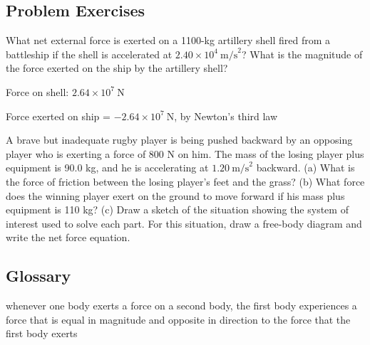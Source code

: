 \documentclass[
]{book}
\providecommand{\tightlist}{%
  \setlength{\itemsep}{0pt}\setlength{\parskip}{0pt}}
\newenvironment{problems-exercises}{}{}
\begin{document}
\hypertarget{fs-id1008305}{}
\begin{problems-exercises}

\hypertarget{problem-exercises-1}{%
\subsection{Problem Exercises}\label{problem-exercises-1}}

\hypertarget{fs-id1740619}{}
\leavevmode\hypertarget{fs-id1407116}{}%
What net external force is exerted on a 1100-kg artillery shell fired
from a battleship if the shell is accelerated at
\({2\text{.}\text{40}\times\text{10}^{4}\ \text{m/s}^{2}}{}\)? What is the
magnitude of the force exerted on the ship by the artillery shell?

\leavevmode\hypertarget{fs-id1443880}{}%
Force on shell:
\({2\text{.}{\text{64} \times \text{10}^{7}}\ \text{N}}{}\)

Force exerted on ship =
\({{- 2}\text{.}{\text{64} \times \text{10}^{7}}\ \text{N}}{}\), by
Newton's third law

\hypertarget{fs-id2300721}{}
\leavevmode\hypertarget{fs-id1791532}{}%
A brave but inadequate rugby player is being pushed backward by an
opposing player who is exerting a force of 800 N on him. The mass of the
losing player plus equipment is 90.0 kg, and he is accelerating at
\({1\text{.}\text{20}\ \text{m/s}^{2}}{}\) backward. (a) What is the force
of friction between the losing player's feet and the grass? (b) What
force does the winning player exert on the ground to move forward if his
mass plus equipment is 110 kg? (c) Draw a sketch of the situation
showing the system of interest used to solve each part. For this
situation, draw a free-body diagram and write the net force equation.

\end{problems-exercises}

\hypertarget{glossary-14}{%
\subsection{Glossary}\label{glossary-14}}

\begin{description}
\tightlist
\item[Newton's third law of motion]
whenever one body exerts a force on a second body, the first body
experiences a force that is equal in magnitude and opposite in
direction to the force that the first body exerts
\end{description}
\end{document}
